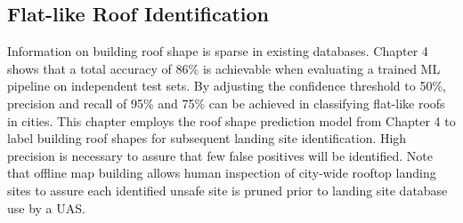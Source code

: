 \subsection{Flat-like Roof Identification}\label{sec:ch5_flat_like}
Information on building roof shape is sparse in existing  databases. Chapter 4 shows that a total accuracy of 86\% is achievable when evaluating a trained ML pipeline on independent test sets. By adjusting the confidence threshold to 50\%, precision and recall of 95\% and 75\% can be achieved in classifying flat-like roofs in cities.  This chapter employs the roof shape prediction model from Chapter 4 to label building roof shapes for subsequent landing site identification. High precision is necessary to assure that few false positives will be identified. Note that offline map building allows  human inspection of city-wide rooftop landing sites to assure each identified unsafe site is pruned prior to landing site database use by a UAS.

